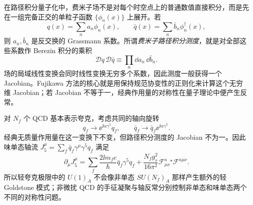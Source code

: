 \begin{definition}
在路径积分量子化中，费米子场不是对每个时空点上的普通数值直接积分，而是先在一组完备正交的单粒子函数 $\{\phi_n(x)\}$ 上展开。若
\begin{equation*}
 q(x)=\sum_n a_n\phi_n(x),
 \qquad
 \bar q(x)=\sum_n\bar b_n\phi_n^\dagger(x),
\end{equation*}
则 $a_n,\bar b_n$ 是反交换的 Grassmann 系数。所谓\emph{费米子路径积分测度}，就是对全部这些系数作 Berezin 积分的乘积
\begin{equation*}
 \mathcal Dq\,\mathcal D\bar q
 \equiv\prod_n\dd a_n\,\dd\bar b_n.
\end{equation*}
场的局域线性变换会同时线性变换无穷多个系数，因此测度一般获得一个 Jacobian。Fujikawa 方法的核心就是用保持规范协变性的正则化来计算这个无穷维 Jacobian；若 Jacobian 不等于一，经典作用量的对称性在量子理论中便产生反常。
\end{definition}

\begin{proposition}
对 $N_f$ 个 QCD 基本表示夸克，考虑共同的轴向旋转
\begin{equation}
{
 q_f\to \ee^{\ii\alpha\gamma^5}q_f,
 \qquad
 \bar q_f\to \bar q_f\ee^{\ii\alpha\gamma^5}.}
\label{eq:qcd-singlet-axial-rotation-dp68}
\end{equation}
经典无质量作用量在这一变换下不变，但路径积分测度的 Jacobian 不为一。因此味单态轴流 $J_5^\mu=\sum_f\bar q_f\gamma^\mu\gamma^5q_f$ 满足
\begin{equation}
 {
 \partial_\mu J_5^\mu
 =\sum_f\frac{2\ii m_fc}{\hbar}\bar q_f\gamma^5q_f
 +\frac{N_f g_s^2}{16\pi^2}
 \mathcal F_{\mu\nu}^a{}^\star\!\mathcal F^{a\mu\nu}.}
 \label{eq:qcd-singlet-axial-anomaly-dp32}
\end{equation}
所以轻夸克极限中的 $U(1)_A$ 不会像非单态 $SU(N_f)_A$ 那样产生额外的轻 Goldstone 模式；非微扰 QCD 的手征凝聚与轴反常分别控制非单态和味单态两个不同的对称性问题。
\end{proposition}

